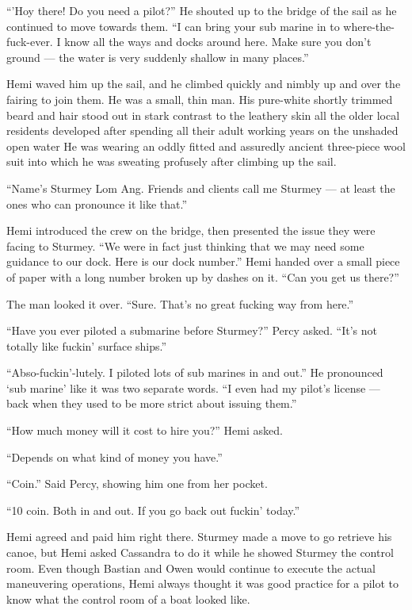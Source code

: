 \documentclass[]{scrbook}
\begin{document}
``'Hoy there! Do you need a pilot?'' He shouted up to the bridge of the
sail as he continued to move towards them. ``I can bring your sub marine
in to where-the-fuck-ever. I know all the ways and docks around here.
Make sure you don't ground --- the water is very suddenly shallow in
many places.''

Hemi waved him up the sail, and he climbed quickly and nimbly up and
over the fairing to join them. He was a small, thin man. His pure-white
shortly trimmed beard and hair stood out in stark contrast to the
leathery skin all the older local residents developed after spending all
their adult working years on the unshaded open water He was wearing an
oddly fitted and assuredly ancient three-piece wool suit into which he
was sweating profusely after climbing up the sail.

``Name's Sturmey Lom Ang. Friends and clients call me Sturmey --- at
least the ones who can pronounce it like that.''

Hemi introduced the crew on the bridge, then presented the issue they
were facing to Sturmey. ``We were in fact just thinking that we may need
some guidance to our dock. Here is our dock number.'' Hemi handed over a
small piece of paper with a long number broken up by dashes on it. ``Can
you get us there?''

The man looked it over. ``Sure. That's no great fucking way from here.''

``Have you ever piloted a submarine before Sturmey?'' Percy asked.
``It's not totally like fuckin' surface ships.''

``Abso-fuckin'-lutely. I piloted lots of sub marines in and out.'' He
pronounced `sub marine' like it was two separate words. ``I even had my
pilot's license --- back when they used to be more strict about issuing
them.''

``How much money will it cost to hire you?'' Hemi asked.

``Depends on what kind of money you have.''

``Coin.'' Said Percy, showing him one from her pocket.

``10 coin. Both in and out. If you go back out fuckin' today.''

Hemi agreed and paid him right there. Sturmey made a move to go retrieve
his canoe, but Hemi asked Cassandra to do it while he showed Sturmey the
control room. Even though Bastian and Owen would continue to execute the
actual maneuvering operations, Hemi always thought it was good practice
for a pilot to know what the control room of a boat looked like.
\end{document}
